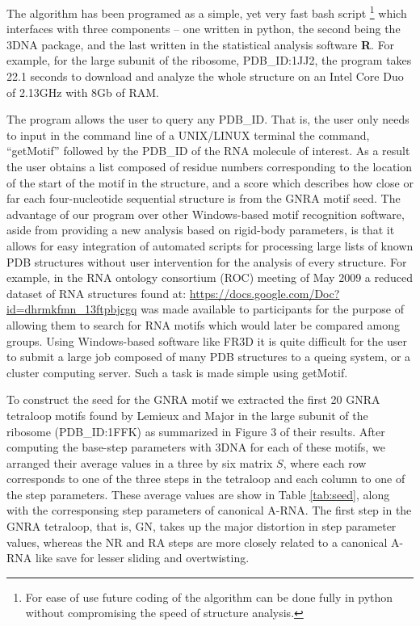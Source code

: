 The  algorithm has  been programed  as a  simple, yet  very  fast bash
script \footnote{For ease of use future coding of the algorithm can be
  done  fully in python  without compromising  the speed  of structure
  analysis.}  which interfaces with three components -- one written in
python, the second being the 3DNA package, and the last written in the
statistical analysis software \textbf{R}.   For example, for the large
subunit of the ribosome,  PDB\_ID:1JJ2, the program takes 22.1 seconds
to download  and analyze the whole  structure on an Intel  Core Duo of
2.13GHz with 8Gb of RAM.

The program  allows the user to  query any PDB\_ID. That  is, the user
only needs to  input in the command line of  a UNIX/LINUX terminal the
command, ``getMotif'' followed  by the PDB\_ID of the  RNA molecule of
interest.  As  a result  the user obtains  a list composed  of residue
numbers corresponding to the location of the start of the motif in the
structure,  and  a  score  which  describes  how  close  or  far  each
four-nucleotide sequential structure is from the GNRA motif seed.  The
advantage of  our program  over other Windows-based  motif recognition
software,  aside from  providing a  new analysis  based  on rigid-body
parameters,  is  that it  allows  for  easy  integration of  automated
scripts  for processing large  lists of  known PDB  structures without
user intervention for the analysis of every structure. For example, in
the  RNA ontology  consortium  (ROC)  meeting of  May  2009 a  reduced
dataset        of        RNA        structures        found        at:
\url{https://docs.google.com/Doc?id=dhrmkfmn_13ftpbjcgq}    was   made
available to participants for the  purpose of allowing them to search
for  RNA motifs  which would  later be  compared among  groups.  Using
Windows-based  software  like  FR3D  \cite{sarver2008}  it  is  quite
difficult for  the user  to submit  a large job  composed of  many PDB
structures to a  queing system, or a cluster  computing server. Such a
task is made simple using getMotif.

To construct  the seed for  the GNRA motif  we extracted the  first 20
GNRA tetraloop motifs found by Lemieux and Major \cite{lemieux2006} in
the  large subunit  of the  ribosome (PDB\_ID:1FFK)  as  summarized in
Figure 3  of their results.  After computing  the base-step parameters
with 3DNA for  each of these motifs, we  arranged their average values
in a three by six matrix $S$, where each row corresponds to one of the
three  steps in  the tetraloop  and  each column  to one  of the  step
parameters.  These  average values  are show in  Table \ref{tab:seed},
along with  the corresponsing step parameters of  canonical A-RNA. The
first step  in the  GNRA tetraloop,  that is, GN,  takes up  the major
distortion in step  parameter values, whereas the NR  and RA steps are
more closely related to a canonical A-RNA like save for lesser sliding
and overtwisting.


